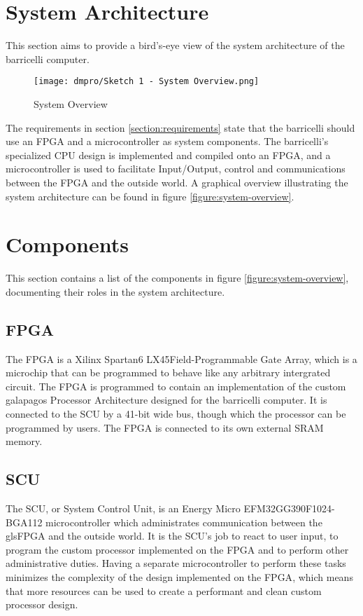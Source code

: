 \section{System Architecture}

This section aims to provide a bird's-eye view of the system architecture of the \Gls{barricelli} computer.

\begin{figure}[H]
\texttt{[image: dmpro/Sketch 1 - System Overview.png]}
\caption{System Overview}
\label{figure:system-overview}
\end{figure}

The requirements in section \vref{section:requirements} state that the \Gls{barricelli} should use an \gls{FPGA} and a microcontroller as system components.
The \Gls{barricelli}'s specialized CPU design is implemented and compiled onto an \gls{FPGA}, and a microcontroller is used to facilitate Input/Output, control and communications between the \gls{FPGA} and the outside world.
A graphical overview illustrating the system architecture can be found in figure \vref{figure:system-overview}.

\section{Components}

This section contains a list of the components in figure \vref{figure:system-overview}, documenting their roles in the system architecture.

\subsection{\gls{FPGA}}

The \gls{FPGA} is a Xilinx Spartan6 LX45\cn Field-Programmable Gate Array, which is a microchip that can be programmed to behave like any arbitrary intergrated circuit.
The \gls{FPGA} is programmed to contain an implementation of the custom \Gls{galapagos} Processor Architecture designed for the \Gls{barricelli} computer.
It is connected to the \gls{SCU} by a 41-bit wide bus, though which the processor can be programmed by users.
The \gls{FPGA} is connected to its own external \gls{SRAM} memory.

\subsection{\gls{SCU}}

The \gls{SCU}, or System Control Unit, is an Energy Micro EFM32GG390F1024-BGA112 microcontroller which administrates communication between the gls{FPGA} and the outside world.
It is the \gls{SCU}'s job to react to user input, to program the custom processor implemented on the FPGA and to perform other administrative duties.
Having a separate microcontroller to perform these tasks minimizes the complexity of the design implemented on the \gls{FPGA}, which means that more resources can be used to create a performant and clean custom processor design.

